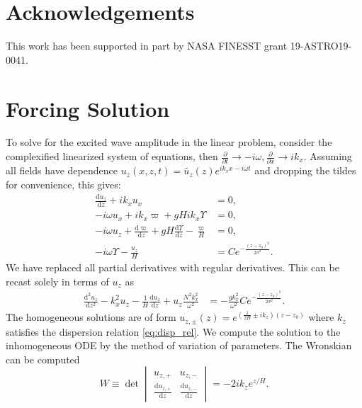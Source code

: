 \documentclass[
        fleqn,
        usenatbib,
        referee,
    ]{mnras}
\newcommand*{\rd}[2]{\frac{\mathrm{d}#1}{\mathrm{d}#2}}
\newcommand*{\rtd}[2]{\frac{\mathrm{d}^2#1}{\mathrm{d}#2^2}}
\newcommand*{\pd}[2]{\frac{\partial#1}{\partial#2}}
\newcommand*{\p}[1]{\left(#1\right)}
\begin{document}
\section{Acknowledgements}\label{s:ack}

This work has been supported in part by NASA FINESST grant
19-ASTRO19-0041.%




\clearpage
\onecolumn
\appendix

\section{Forcing Solution}\label{s:force_solved}

To solve for the excited wave amplitude in the linear problem, consider the
complexified linearized system of equations, then $\pd{}{t} \to -i\omega,
\pd{}{x} \to ik_x$. Assuming all fields have dependence $u_z(x, z, t) =
\tilde{u_z}(z) e^{ik_xx - i\omega t}$ and dropping the tildes for convenience,
this gives:
\begin{align*}
    \rd{u_{z}}{z} + ik_xu_x &= 0,\\
    -i\omega u_x + ik_x \varpi + gHik_x \Upsilon &= 0,\\
    -i\omega u_{z} + \rd{\varpi}{z} + gH\rd{\Upsilon}{z}
        - \frac{\varpi}{H} &= 0,\\
    -i\omega \Upsilon - \frac{u_{z}}{H} &=
        Ce^{-\frac{(z - z_0)^2}{2\sigma^2}}.
\end{align*}
We have replaced all partial derivatives with regular derivatives. This can be
recast solely in terms of $u_{z}$ as
\begin{align*}
     \rtd{u_{z}}{z} - k_x^2u_{z} - \frac{1}{H}\rd{u_{z}}{z}
        + u_{z}\frac{N^2k_x^2}{\omega^2} &=
    -\frac{gk_x^2}{\omega^2}Ce^{-\frac{(z - z_0)^2}{2\sigma^2}}
        .\label{eq:narrow_inhomo}
\end{align*}
The homogeneous solutions are of form $u_{z,\pm}(z) = e^{\p{\frac{1}{2H} \pm
ik_z}\p{z - z_0}}$ where $k_z$ satisfies the dispersion relation
\autoref{eq:disp_rel}. We compute the solution to the inhomogeneous ODE by the
method of variation of parameters. The Wronskian can be computed
\begin{equation}
    W \equiv \det \begin{vmatrix}
        u_{z,+} & u_{z,-} \\[4pt]
        \rd{u_{z,+}}{z} & \rd{u_{z,-}}{z}
    \end{vmatrix} = -2ik_ze^{z/H}.
\end{equation}
\end{document}
